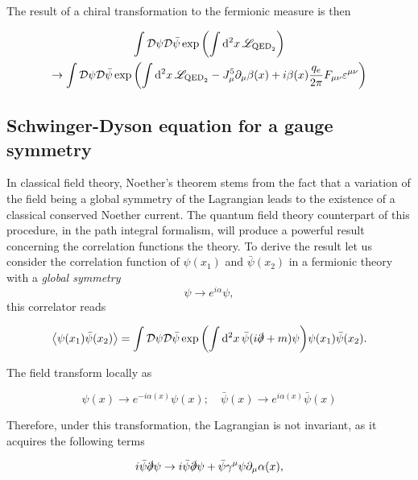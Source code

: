 The result of a chiral transformation to the fermionic measure is then

\begin{multline}
           \int \mathcal{D}\psi \mathcal{D}\bar\psi \exp\qty(\int \dd[2]{x}\mathscr{L}_{\text{QED}_2})\\
        \to \int \mathcal{D}\psi \mathcal{D}\bar\psi \exp \qty(\int \dd[2]{x}\mathscr{L}_{\text{QED}_2} -J^5_\mu \partial_\mu \beta(x) +i\beta(x)\frac{q_e}{2\pi}F_{\mu\nu}\varepsilon^{\mu\nu} )
        \label{eq:intanomaly}
\end{multline}



\subsection{Schwinger-Dyson equation for a gauge symmetry}\label{ssec:SchwingerDyson}

In classical field theory, Noether's theorem stems from the fact that a variation of the field being a global symmetry of the Lagrangian leads to the existence of a classical conserved Noether current. The quantum field theory counterpart of this procedure, in the path integral formalism, will produce a powerful result concerning the correlation functions the theory. To derive the result let us consider the correlation function of $\psi(x_1)$ and $\bar\psi(x_2)$ in a fermionic theory with a \emph{global symmetry} $$\psi\to e^{i\alpha}\psi,$$
this correlator reads

\begin{equation}
    \expval{\psi(x_1)\bar\psi(x_2)} = \int \mathcal{D}\psi \mathcal{D}\bar\psi \exp\qty(\int \dd[2]{x}\bar\psi(i\slashed{\partial} + m)\psi)\psi(x_1)\bar\psi(x_2).
\end{equation}

The field transform locally as

\begin{equation}
    \psi(x)\to e^{-i\alpha(x)}\psi(x);\quad  \bar\psi(x)\to e^{i\alpha(x)}\bar\psi(x)
    \label{eq:transformation}
\end{equation}

Therefore, under this transformation, the Lagrangian is not invariant, as it acquires the following terms

\begin{equation}
    i\bar\psi\slashed{\partial}\psi \to i\bar\psi\slashed{\partial}\psi + \bar\psi\gamma^\mu\psi\partial_\mu\alpha(x),
\end{equation}

